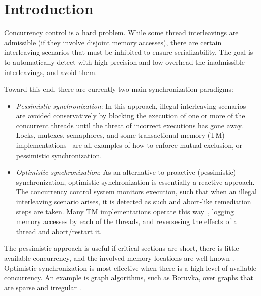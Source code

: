 \section{Introduction}\label{Se:intro}

Concurrency control is a hard problem. While some thread interleavings are admissible (if they involve disjoint memory accesses), there are certain interleaving scenarios that must be inhibited to ensure serializability. The goal is to automatically detect with high precision and low overhead the inadmissible interleavings, and avoid them.  

Toward this end, there are currently two main synchronization paradigms:
\begin{itemize}
	\item \textit{Pessimistic synchronization}: In this approach, illegal interleaving scenarios are avoided conservatively by blocking the execution of one or more of the concurrent threads until the threat of incorrect executions has gone away. Locks, mutexes, semaphores, and some transactional memory (TM) implementations~\cite{ppopp/HerlihyK08,nirpess} are all examples of how to enforce mutual exclusion, or pessimistic synchronization.
	\item \textit{Optimistic synchronization}: As an alternative to proactive (pessimistic) synchronization, optimistic synchronization is essentially a reactive approach. The concurrency control system monitors execution, such that when an illegal interleaving scenario arises, it is detected as such and abort-like remediation steps are taken. Many TM implementations operate this way~\cite{DBLP:conf/isca/HerlihyM93}, logging memory accesses by each of the threads, and reversesing the effects of a thread and abort/restart it.
\end{itemize}

\noindent
The pessimistic approach is useful if critical sections are short, there is little available concurrency, and the involved memory locations are well known \cite{AndiKleen}. Optimistic synchronization is most effective when there is a high level of available concurrency. An example is graph algorithms, such as Boruvka, over graphs that are sparse and irregular \cite{KulkarniGalois}.
%


